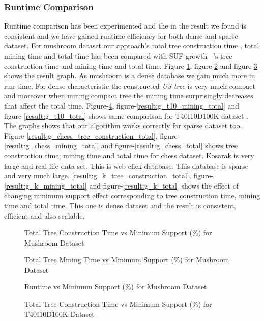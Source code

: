 \documentclass[conference]{IEEEtran}
\begin{document}
\subsubsection{Runtime Comparison}
    Runtime comparison has been experimented and the in the result we found is consistent and we have gained runtime efficiency for both dense and sparse dataset. For mushroom dataset our approach's total tree construction time , total mining time and total time has been compared with SUF-growth ~\cite{suf_growth}'s tree construction time and mining time and total time. Figure-\ref{result:g_m_tree_construction_total}, figure-\ref{result:g_m_mining_total} and figure-\ref{result:g_m_total} shows the result graph. As mushroom is a dense database we gain much more in run time. For dense characteristic the constructed \emph{US-tree} is very much compact and moreover when mining compact tree the mining time surprisingly decreases that affect the total time. Figure-\ref{result:g_t10_tree_construction_total}, figure-\ref{result:g_t10_mining_total} and figure-\ref{result:g_t10_total} shows same comparison for T40I10D100K dataset . The graphs shows that our algorithm works correctly for sparse dataset too. Figure-\ref{result:g_chess_tree_construction_total}, figure-\ref{result:g_chess_mining_total} and figure-\ref{result:g_chess_total} shows tree construction time, mining time and total time for chess dataset. Kosarak is very large and real-life data set. This is web click database. This database is sparse and very much large. \ref{result:g_k_tree_construction_total}, figure-\ref{result:g_k_mining_total} and figure-\ref{result:g_k_total} shows the effect of changing minimum support effect corresponding to tree construction time, mining time and total time. This one is dense dataset and the result is consistent, efficient and also scalable.
            \begin{figure}[h]
            \centering
                
            \caption{Total Tree Construction Time vs Minimum Support (\%) for Mushroom Dataset }
            \label{result:g_m_tree_construction_total}
            \end{figure}
            
            \begin{figure}[h]
            \centering
                
            \caption{Total Tree Mining Time vs Minimum Support (\%) for Mushroom Dataset }
            \label{result:g_m_mining_total}
            \end{figure}
            \begin{figure}[h]
            \centering
                
            \caption{Runtime vs Minimum Support (\%) for Mushroom Dataset }
            \label{result:g_m_total}
            \end{figure}
            \begin{figure}[h]
            \centering
                
            \caption{Total Tree Construction Time vs Minimum Support (\%) for T40I10D100K Dataset }
            \label{result:g_t10_tree_construction_total}
            \end{figure}
            
\end{document}
